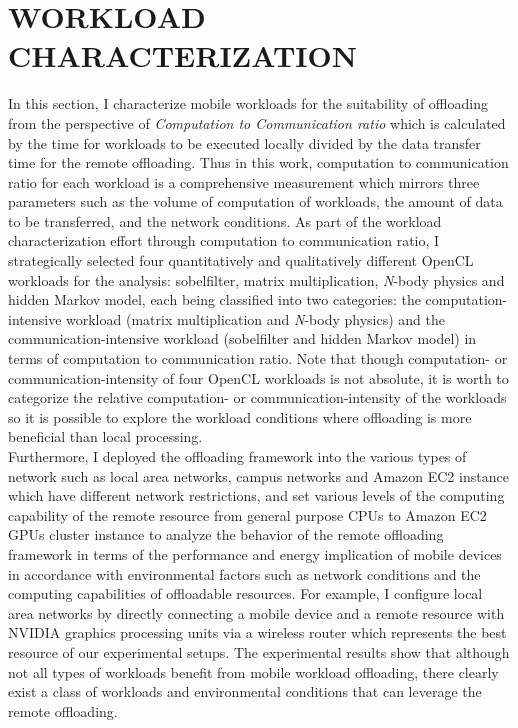 \chapter{WORKLOAD CHARACTERIZATION}
\label{chap:character}
%
In this section, I characterize mobile workloads for the
suitability of offloading from the perspective of {\it Computation to
Communication ratio} which is calculated by the time for workloads to be
executed locally divided by the data transfer time for the remote
offloading.
%
Thus in this work, computation to communication ratio for each workload is
a comprehensive measurement which mirrors three parameters such as the
volume of computation of workloads, the amount of data to be transferred, and the
network conditions. 
%
As part of the workload characterization effort through computation to
communication ratio, I strategically selected four quantitatively and qualitatively 
different OpenCL workloads for the analysis:
sobelfilter, matrix multiplication, {\it N}-body physics and hidden
Markov model, each being classified into two categories: 
the computation-intensive workload (matrix multiplication and 
{\it N}-body physics) and the communication-intensive workload 
(sobelfilter and hidden Markov model) in terms of computation to communication ratio.
%
Note that though computation- or communication-intensity of
four OpenCL workloads is not absolute, it is worth to categorize 
the relative computation- or communication-intensity of the workloads so
it is possible to explore the workload conditions where offloading is
more beneficial than local processing.\\    
%
Furthermore, I deployed the offloading framework into the
various types of network such as local area networks, campus networks
and Amazon EC2 instance which have different network restrictions, and
set various levels of the computing capability of the remote
resource from general purpose CPUs to Amazon EC2 GPUs cluster instance to
analyze the behavior of the remote offloading framework in terms of the
performance and energy implication of mobile devices in accordance with
environmental factors such as network conditions and the computing
capabilities of offloadable resources.
%
For example, I configure local area networks by directly connecting a
mobile device and a remote resource with NVIDIA graphics processing
units via a wireless router which represents the best resource of our
experimental setups.
%
The experimental results show that although not all types of workloads
benefit from mobile workload offloading, there clearly exist a class of
workloads and environmental conditions that can leverage the remote
offloading.
%
